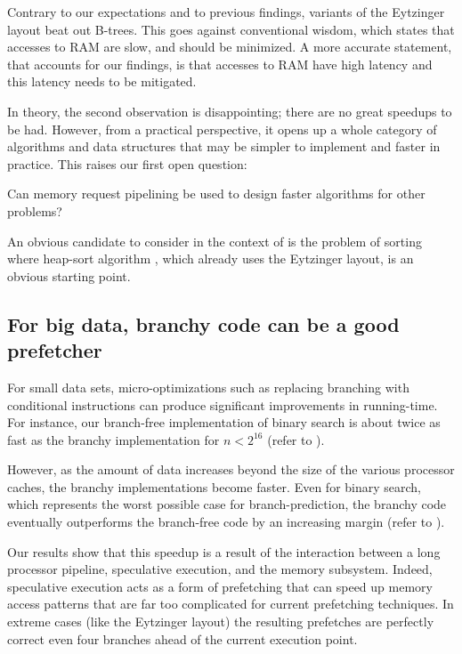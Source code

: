 \documentclass{patmorin}
\begin{document}
Contrary to our expectations and to previous findings, variants of the
Eytzinger layout beat out B-trees.  This goes against conventional wisdom,
which states that accesses to RAM are slow, and should be minimized.
A more accurate statement, that accounts for our findings, is that
accesses to RAM have high latency and this latency needs to be mitigated.


In theory, the second observation is disappointing; there are no great
speedups to be had. However, from a practical perspective, it opens up
a whole category of algorithms and data structures that may be simpler
to implement and faster in practice.  This raises our first open question:

\begin{op}
  Can memory request pipelining be used to design faster algorithms for
  other problems?
\end{op}

An obvious candidate to consider in the context of 
is the problem of sorting where heap-sort algorithm \cite{heap-sort},
which already uses the Eytzinger layout, is an obvious starting point.

\subsection{For big data, branchy code can be a good prefetcher}

For small data sets, micro-optimizations such as replacing branching
with conditional instructions can produce significant improvements
in running-time.  For instance, our branch-free implementation of
binary search is about twice as fast as the branchy implementation for
$n<2^{16}$ (refer to ).  

However, as the amount of data increases beyond the size of the
various processor caches, the branchy implementations become faster.
Even for binary search, which represents the worst possible case for
branch-prediction, the branchy code eventually outperforms the branch-free
code by an increasing margin (refer to ).

Our results show that this speedup is a result of the interaction
between a long processor pipeline, speculative execution, and the memory
subsystem.  Indeed, speculative execution acts as a form of prefetching
that can speed up memory access patterns that are far too complicated
for current prefetching techniques.  In extreme cases (like the Eytzinger
layout) the resulting prefetches are perfectly correct even four branches
ahead of the current execution point.
\end{document}
